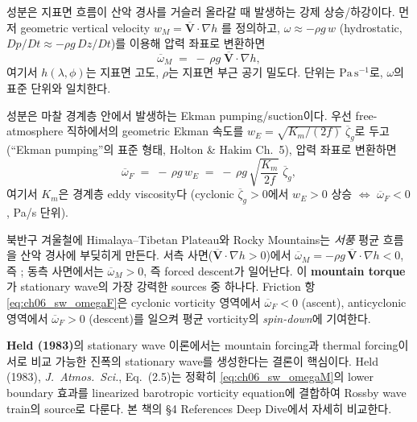 \begin{definition}\label{def:ch06_sw_omegaMF}
 성분은 지표면 흐름이 산악 경사를 거슬러 올라갈 때 발생하는
강제 상승/하강이다.  먼저 geometric vertical velocity $w_M = \overline{\mathbf{V}}\!\cdot\!\nabla h$
를 정의하고, $\omega \approx -\rho g\, w$ (hydrostatic, $Dp/Dt \approx -\rho g \,Dz/Dt$)를 이용해
압력 좌표로 변환하면
\begin{equation}\label{eq:ch06_sw_omegaM}
  \overline{\omega}_M \;=\; -\,\rho g\;\overline{\mathbf{V}}\!\cdot\!\nabla h ,
\end{equation}
여기서 $h(\lambda,\phi)$는 지표면 고도, $\rho$는 지표면 부근 공기 밀도다.
단위는 $\mathrm{Pa\,s^{-1}}$로, $\omega$의 표준 단위와 일치한다.

 성분은 마찰 경계층 안에서 발생하는 Ekman pumping/suction이다.
우선 free-atmosphere 직하에서의 geometric Ekman 속도를
$w_E = \sqrt{K_m/(2f)}\;\overline{\zeta}_g$로 두고(``Ekman pumping''의 표준 형태,
Holton \& Hakim Ch.~5), 압력 좌표로 변환하면
\begin{equation}\label{eq:ch06_sw_omegaF}
  \overline{\omega}_F \;=\; -\,\rho g\, w_E
                       \;=\; -\,\rho g\,\sqrt{\frac{K_m}{2 f}}\;\overline{\zeta}_g ,
\end{equation}
여기서 $K_m$은 경계층 eddy viscosity다 (cyclonic $\overline{\zeta}_g>0$에서
$w_E>0$ 상승 $\Leftrightarrow$ $\overline{\omega}_F<0$, Pa/s 단위).
\end{definition}

\begin{remark}\label{rem:ch06_sw_torque}
북반구 겨울철에 Himalaya--Tibetan Plateau와 Rocky Mountains는
\emph{서풍} 평균 흐름을 산악 경사에 부딪히게 만든다.
서측 사면($\overline{\mathbf{V}}\!\cdot\!\nabla h > 0$)에서
$\overline{\omega}_M = -\rho g\,\overline{\mathbf{V}}\!\cdot\!\nabla h < 0$,
즉 ; 동측 사면에서는 $\overline{\omega}_M > 0$, 즉
forced descent가 일어난다.
이 \textbf{mountain torque}가 stationary wave의 가장 강력한 sources 중 하나다.
Friction 항 \eqref{eq:ch06_sw_omegaF}은 cyclonic vorticity 영역에서
$\overline{\omega}_F<0$ (ascent), anticyclonic 영역에서 $\overline{\omega}_F>0$
(descent)를 일으켜 평균 vorticity의 \emph{spin-down}에 기여한다.
\end{remark}

\begin{hisublock}
\textbf{Held (1983)}의 stationary wave 이론에서는 mountain forcing과 thermal forcing이
서로 비교 가능한 진폭의 stationary wave를 생성한다는 결론이 핵심이다.
Held (1983), \emph{J.\ Atmos.\ Sci.}, Eq.~(2.5)는 정확히 \eqref{eq:ch06_sw_omegaM}의 lower
boundary 효과를 linearized barotropic vorticity equation에 결합하여
Rossby wave train의 source로 다룬다.
본 책의 §4 References Deep Dive에서 자세히 비교한다.
\end{hisublock}


